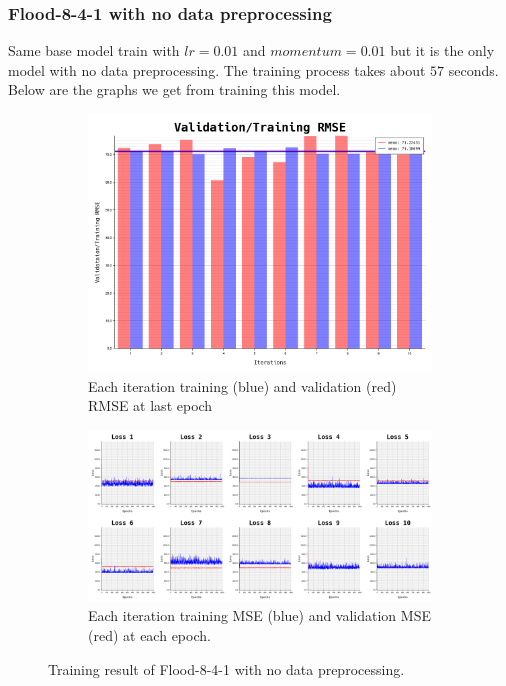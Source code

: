 \documentclass{article}
\begin{document}
\newpage
\subsubsection*{Flood-8-4-1 with no data preprocessing}
Same base model train with $lr = 0.01$ and $momentum = 0.01$ but 
it is the only model with no data preprocessing. The training process takes about $57$ seconds.
Below are the graphs we get from training this model. 
\begin{figure}[ht]
	\begin{subfigure}{\textwidth}
		\centering
		\includegraphics[scale=0.3]{flood-8-4-1_4/cv_l}
		\caption{Each iteration training (blue) and validation (red) RMSE at last epoch}
		\label{fig:5a}
	\end{subfigure}
	\begin{subfigure}{\textwidth}
		\includegraphics[width=\textwidth]{flood-8-4-1_4/loss}
		\caption{Each iteration training MSE (blue) and validation MSE (red) at each epoch.}
		\label{fig:5b}
	\end{subfigure}
	\caption{Training result of Flood-8-4-1 with no data preprocessing.}
	\label{fig:5}
\end{figure}
\FloatBarrier
\newpage
\end{document}

